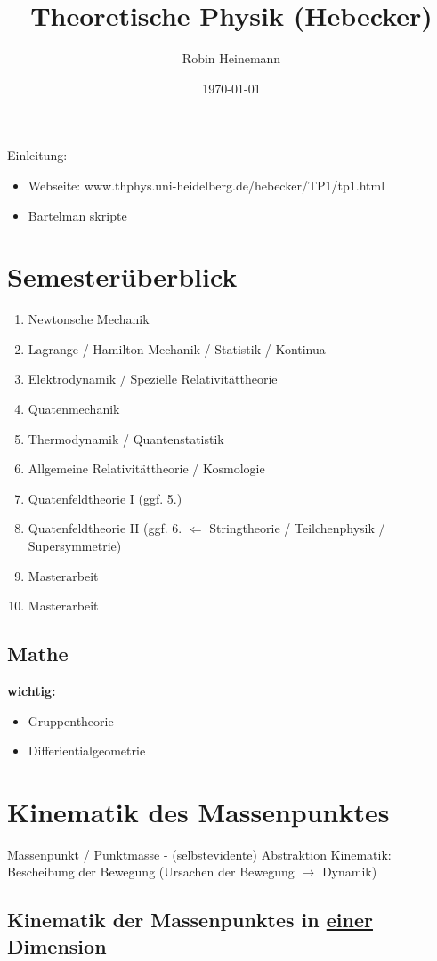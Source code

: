 \documentclass[a4paper]{scrartcl}
\author{Robin Heinemann}
\date{\today}
\title{Theoretische Physik (Hebecker)}
\theoremstyle{definition}
\theoremstyle{plain}
\theoremstyle{remark}
\begin{document}
\maketitle
\tableofcontents

Einleitung: \\
\begin{itemize}
\item Webseite: www.thphys.uni-heidelberg.de/hebecker/TP1/tp1.html
\item Bartelman skripte
\end{itemize}

\section{Semesterüberblick}
\label{sec-1}
\begin{enumerate}
\item Newtonsche Mechanik
\item Lagrange / Hamilton Mechanik / Statistik / Kontinua
\item Elektrodynamik / Spezielle Relativitättheorie
\item Quatenmechanik
\item Thermodynamik / Quantenstatistik
\item Allgemeine Relativitättheorie / Kosmologie
\item Quatenfeldtheorie I (ggf. 5.)
\item Quatenfeldtheorie II (ggf. 6. $\Leftarrow$ Stringtheorie / Teilchenphysik / Supersymmetrie)
\item Masterarbeit
\item Masterarbeit
\end{enumerate}
\subsection{Mathe}
\label{sec-1-1}
\textbf{wichtig:}
\begin{itemize}
\item Gruppentheorie
\item Differientialgeometrie
\end{itemize}
\section{Kinematik des Massenpunktes}
\label{sec-2}
Massenpunkt / Punktmasse - (selbstevidente) Abstraktion
Kinematik: Bescheibung der Bewegung (Ursachen der Bewegung $\rightarrow$ Dynamik)
\subsection{Kinematik der Massenpunktes in \underline{einer} Dimension}
\label{sec-2-1}
\end{document}
